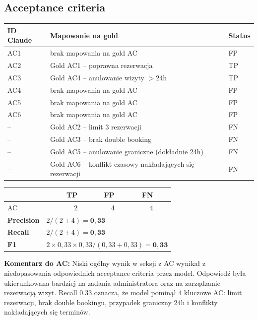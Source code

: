 \documentclass[12pt,a4paper]{article}
\newcommand{\tp}[1]{\colorbox{tpcolor}{\small #1}}
\newcommand{\fp}[1]{\colorbox{fpcolor}{\small #1}}
\newcommand{\fn}[1]{\colorbox{fncolor}{\small #1}}
\begin{document}
\vspace{1em}
\subsection{Acceptance criteria}

\begin{tabular}{p{2.5cm} p{7cm} l}
\toprule
\textbf{ID Claude} & \textbf{Mapowanie na gold} & \textbf{Status} \\
\midrule
AC1 & brak mapowania na gold AC & \fp{FP} \\
AC2 & Gold AC1 -- poprawna rezerwacja & \tp{TP} \\
AC3 & Gold AC4 -- anulowanie wizyty $> $24h & \tp{TP} \\
AC4 & brak mapowania na gold AC & \fp{FP} \\
AC5 & brak mapowania na gold AC & \fp{FP} \\
AC6 & brak mapowania na gold AC & \fp{FP} \\
\midrule
-- & Gold AC2 -- limit 3 rezerwacji & \fn{FN} \\
-- & Gold AC3 -- brak double booking & \fn{FN} \\
-- & Gold AC5 -- anulowanie graniczne (dokładnie 24h) & \fn{FN} \\
-- & Gold AC6 -- konflikt czasowy nakładających się rezerwacji & \fn{FN} \\
\bottomrule
\end{tabular}

\vspace{0.5em}
\begin{tabular}{lrrrr}
\toprule
& \textbf{TP} & \textbf{FP} & \textbf{FN} & \\
\midrule
AC & 2 & 4 & 4 & \\
\midrule
\textbf{Precision} & \multicolumn{4}{l}{$2 / (2+4) = \mathbf{0{,}33}$} \\
\textbf{Recall}    & \multicolumn{4}{l}{$2 / (2+4) = \mathbf{0{,}33}$} \\
\textbf{F1}        & \multicolumn{4}{l}{$2 \times 0{,}33 \times 0{,}33 / (0{,}33+0{,}33) = \mathbf{0{,}33}$} \\
\bottomrule
\end{tabular}

\vspace{0.5em}
\begin{mdframed}[backgroundcolor=metabg, linewidth=0pt, innerleftmargin=10pt, innerrightmargin=10pt, innertopmargin=6pt, innerbottommargin=6pt]
\small\textbf{Komentarz do AC:} Niski ogólny wynik w seksji z AC wynikał z niedopasowania odpowiednich acceptance criteria przez model. Odpowiedź była ukierunkowana bardziej na zadania administratora oraz na zarządzanie rezerwacją wizyt. Recall 0.33 oznacza, że model pominął 4 kluczowe AC: limit rezerwacji, brak double bookingu, przypadek graniczny 24h i konflikty nakładających się terminów.
\end{mdframed}
\end{document}
